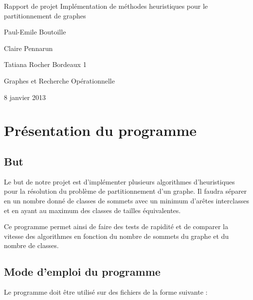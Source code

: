 \documentclass[12pt]{article}
\begin{document}
\begin{titlepage}
\begin{center}

\hfill
\vfill
\bigskip
\huge{Rapport de projet} 
\vfill
\bigskip 
\Huge 
\bigskip Implémentation de méthodes heuristiques pour le partitionnement de graphes \par 
\vfill
\Large Paul-Emile Boutoille \par
		Claire Pennarun \par 
		Tatiana Rocher
\vfill
\Large Bordeaux 1 \par \Large Graphes et Recherche Opérationnelle		
		\bigskip 
\bigskip

\Large
8 janvier 2013
\end{center}
\end{titlepage}

\tableofcontents
\newpage


\section{Présentation du programme}

\subsection{But}

Le but de notre projet est d'implémenter plusieurs algorithmes d’heuristiques pour la résolution du problème de partitionnement d’un graphe. Il faudra séparer en un nombre donné de classes de sommets avec un minimum d'arêtes interclasses et en ayant au maximum des classes de tailles équivalentes. 
~\par Ce programme permet ainsi de faire des tests de rapidité et de comparer la vitesse des algorithmes en fonction du nombre de sommets du graphe et du nombre de classes.

\subsection{Mode d'emploi du programme}

Le programme doit être utilisé sur des fichiers de la forme suivante :
~\\

~\\
~\\
\end{document}
